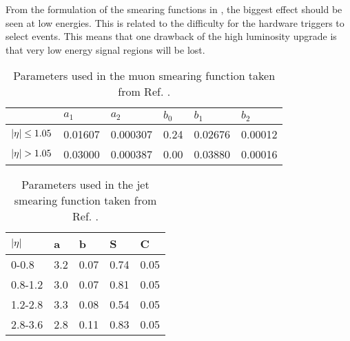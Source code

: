 From the formulation of the smearing functions in , the biggest effect should be seen at low energies. This is related to the difficulty for the hardware triggers to select events. This means that one drawback of the high luminosity upgrade is that very low energy signal regions will be lost.


\begin{table}[H]
\renewcommand{\arraystretch}{1.5} %
\begin{center}
\begin{tabular}{|l|l|l|l|l|l|}
\hline
 &$a_1$&$a_2$&$b_0$&$b_1$&$b_2$ \\ \hline
$|\eta|\leq 1.05$&0.01607&0.000307&0.24&0.02676&0.00012 \\ \hline
$\abs{\eta}>1.05$&0.03000&0.000387&0.00&0.03880&0.00016 \\ \hline
\end{tabular}
\end{center}
\caption{Parameters used in the muon smearing function taken from Ref. \citep{ATL-PHYS-PUB-2013-004}.}
\label{tab:muonparam}
\renewcommand{\arraystretch}{1.0} %
\end{table}
\begin{table}[H]
\renewcommand{\arraystretch}{1.5} %
\begin{center}
\begin{tabular}{|l|l|l|l|l|}
\hline
$|\eta|$&a&b&S&C \\ \hline
0-0.8&3.2&0.07&0.74&0.05 \\
0.8-1.2&3.0&0.07&0.81&0.05 \\
1.2-2.8&3.3&0.08&0.54&0.05 \\
2.8-3.6&2.8&0.11&0.83&0.05 \\ \hline
\end{tabular}
\end{center}
\caption{Parameters used in the jet smearing function taken from Ref. \citep{ATL-PHYS-PUB-2013-004}.}
\label{tab:jetparam}
\renewcommand{\arraystretch}{1.0} %
\end{table}

